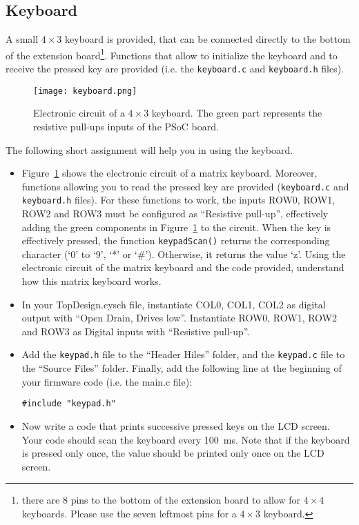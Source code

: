 \newpage
\subsection{Keyboard}

A small $4\times 3$ keyboard is provided, that can be connected directly to the bottom of the extension board\footnote{there are 8 pins to the bottom of the extension board to allow for $4\times 4$ keyboards. Please use the seven leftmost pins for a $4\times 3$ keyboard. }. Functions that allow to initialize the keyboard and to receive the pressed key are provided (i.e. the \texttt{keyboard.c} and \texttt{keyboard.h} files).  
\begin{figure}[h]
	\centering
	\texttt{[image: keyboard.png]}
	\caption{Electronic circuit of a $4\times 3$ keyboard. The green part represents the resistive pull-ups inputs of the PSoC board. }
	\label{fig:keyboard}
\end{figure}
The following short assignment will help you in using the keyboard. 
\begin{itemize}
	\item Figure~\ref{fig:keyboard} shows the electronic circuit of a matrix keyboard. Moreover, functions allowing you to read the pressed key are provided (\texttt{keyboard.c} and \texttt{keyboard.h} files). For these functions to work, the inputs ROW0, ROW1, ROW2 and ROW3 must be configured as ``Resistive pull-up'', effectively adding the green components in Figure~\ref{fig:keyboard} to the circuit. When the key is effectively pressed, the function \texttt{keypadScan()} returns the corresponding character (‘0’ to ‘9’, ‘*’ or ‘\#’).	Otherwise, it returns the value ‘z’. Using the electronic circuit of the matrix keyboard and the code provided, understand how this matrix keyboard works. 
	\item In your TopDesign.cysch file, instantiate COL0, COL1, COL2 as digital output with ``Open Drain, Drives low''. Instantiate ROW0, ROW1, ROW2 and ROW3 as Digital inputs with ``Resistive pull-up''. 
	\item Add the \texttt{keypad.h} file to the ``Header Hiles'' folder, and the \texttt{keypad.c} file to the ``Source Files'' folder. Finally, add the following line at the beginning of your firmware code (i.e. the main.c file): 
\begin{lstlisting}[style=customc]
#include "keypad.h"	
\end{lstlisting}
	\item Now write a code that prints successive pressed keys on the LCD screen. Your code should scan the keyboard every 100~ms. Note that if the keyboard is pressed only once, the value should be printed only once on the LCD screen. 
\end{itemize}






